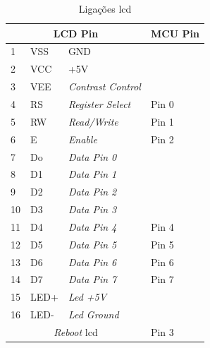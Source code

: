 \begin{table}[H]
	\centering
	\caption{Ligações \acs{lcd}}
	\begin{tabular}{||p{1cm} p{2cm} p{4cm} | p{1cm}||} 
		\hline
		\multicolumn{3}{||c|}{\textbf{LCD Pin}} & \multicolumn{1}{|c||}{\textbf{MCU Pin}}\\ [1ex]
		\hline
		1 & VSS & GND & \\
		2 & VCC & +5V & \\
		3 & VEE & \textit{Contrast Control} & \\
		4 & RS & \textit{Register Select} & Pin 0 \\
		5 & RW & \textit{Read/Write} & Pin 1 \\
		6 & E & \textit{Enable} & Pin 2 \\
		7 & Do & \textit{Data Pin 0} & \\
		8 & D1 & \textit{Data Pin 1} & \\
		9 & D2 & \textit{Data Pin 2} & \\
		10 & D3 & \textit{Data Pin 3} & \\
		11 & D4 & \textit{Data Pin 4} & Pin 4 \\
		12 & D5 & \textit{Data Pin 5} & Pin 5 \\
		13 & D6 & \textit{Data Pin 6} & Pin 6 \\
		14 & D7 & \textit{Data Pin 7} & Pin 7 \\
		15 & LED+ & \textit{Led +5V} &  \\
		16 & LED- & \textit{Led Ground} & \\
		\multicolumn{3}{||c|}{\textit{Reboot} \acs{lcd}} & \multicolumn{1}{|l||}{Pin 3}\\ [1ex]
		\hline
	\end{tabular}
	\label{LCD_connections}
\end{table}
\newpage
